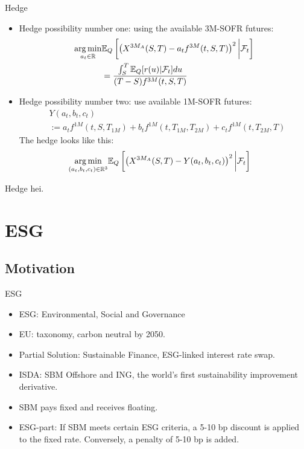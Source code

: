 \documentclass[UKenglish]{beamer}
\newcommand{\E}{\mathbb{E}}  %
\newcommand{\F}{\mathcal{F}} %
\newcommand{\R}{\mathbb{R}}  %
\begin{document}
\begin{frame}{Hedge}
\begin{itemize}
    \item Hedge possibility number one: using the available 3M-SOFR futures: 
\begin{align*}
\underset{a_{t}\in \R}{\arg\min}
&\E_{Q}\left[
\left(
X^{3M_{A}}(S,T)-a_{t}f^{3M}(t,S,T)
\right)^{2}
\bigg{|}\F_{t}
\right] \\ 
&= \frac{
\int_{S}^{T}\E_{Q}[r(u)|\F_{t}]du
}{
(T-S)f^{3M}(t,S,T)
}      
\end{align*}
    \item Hedge possibility number two: use available 1M-SOFR futures: 
\begin{align*}
&Y(a_{t}, b_{t}, c_{t}) \\
&:= 
a_{t}f^{1M}(t,S,T_{1M}) + 
b_{t}f^{1M}(t,T_{1M}, T_{2M}) + 
c_{t}f^{1M}(t,T_{2M}, T)
\end{align*}    
The hedge looks like this: 
\begin{align*}
\underset{(a_{t}, b_{t}, c_{t})\in \R^{3}}{\arg\min}
&\E_{Q}\left[
\left(
X^{3M_{A}}(S,T)-Y(a_{t}, b_{t}, c_{t})
\right)^{2}
\bigg{|}\F_{t}
\right]    
\end{align*}

\end{itemize}
\end{frame}

\begin{frame}{Hedge}
 hei.   
\end{frame}

\section{ESG}

\subsection{Motivation}
\begin{frame}{ESG}
\begin{itemize}
    \item ESG: Environmental, Social and Governance
    \item EU: taxonomy, carbon neutral by 2050. 
    \item Partial Solution: Sustainable Finance,
          ESG-linked interest rate swap. 
    \item ISDA: SBM Offshore and ING, the world's first sustainability improvement derivative. 
    \item SBM pays fixed and receives floating. 
    \item ESG-part: If SBM meets certain ESG criteria, a 5-10 bp discount is applied to the fixed rate. Conversely, a penalty of 5-10 bp is added.  
\end{itemize}
\end{frame}
\end{document}
